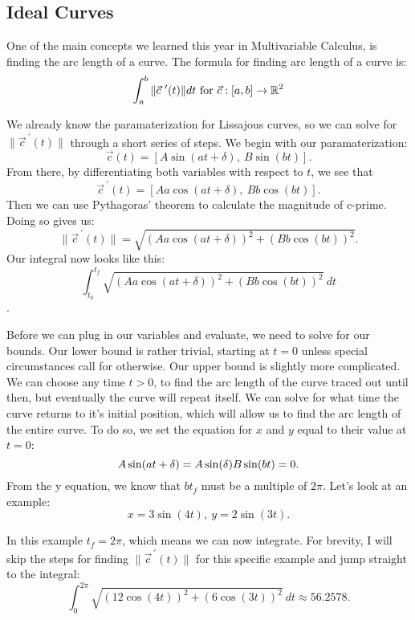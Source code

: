 \subsection{Ideal Curves}
One of the main concepts we learned this year in Multivariable Calculus, is finding the arc length of a curve. The formula for finding arc length of a curve is: \[\int_{a}^{b}\|\vec{c}^{\ \prime}(t)\|dt \text{ for } \vec{c}:[a, b] \rightarrow \mathbb{R}^{2}\]

We already know the paramaterization for Lissajous curves, so we can solve for $\|\vec{c}^{\ \prime}(t)\|$ through a short series of steps. We begin with our paramaterization: \[\vec{c}(t) = [A\sin(at+\delta),\ B\sin(bt)].\] From there, by differentiating both variables with respect to $t$, we see that \[\vec{c}^{\ \prime}(t) = [Aa\cos(at+\delta),\  Bb\cos(bt)].\] Then we can use Pythagoras' theorem to calculate the magnitude of c-prime. Doing so gives us: \[\|\vec{c}^{\ \prime}(t)\| = \sqrt{(Aa\cos(at+\delta))^2 + (Bb\cos(bt))^2}.\] Our integral now looks like this: \[\int_{t_0}^{t_f}\sqrt{(Aa\cos(at+\delta))^2 + (Bb\cos(bt))^2}\ dt\].

Before we can plug in our variables and evaluate, we need to solve for our bounds. Our lower bound is rather trivial, starting at $t=0$ unless special circumstances call for otherwise. Our upper bound is slightly more complicated. We can choose any time $t>0$, to find the arc length of the curve traced out until then, but eventually the curve will repeat itself. We can solve for what time the curve returns to it's initial position, which will allow us to find the arc length of the entire curve. To do so, we set the equation for $x$ and $y$ equal to their value at $t=0$: \[A\sin(at+\delta) = A\sin(\delta) \\ B\sin(bt) = 0.\] From the y equation, we know that $bt_f$ must be a multiple of $2\pi$. Let's look at an example: \[x=3\sin(4t),\ y=2\sin(3t).\]
\begin{center}
\end{center}

In this example $t_f = 2\pi$, which means we can now integrate. For brevity, I will skip the steps for finding $\|\vec{c}^{\ \prime}(t)\|$ for this specific example and jump straight to the integral: \[\int_{0}^{2\pi}\sqrt{(12\cos(4t))^2 + (6\cos(3t))^2}\ dt \approx 56.2578.\]

